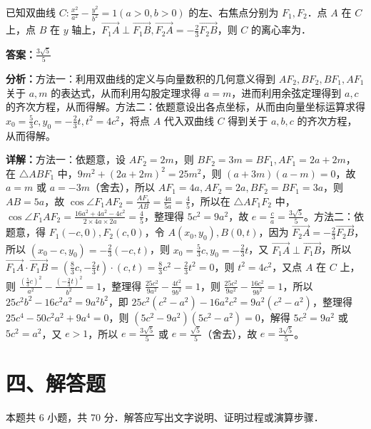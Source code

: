 \begin{question}[points=5]
已知双曲线 $C:\frac{x^2}{a^2}-\frac{y^2}{b^2}=1(a>0,b>0)$ 的左、右焦点分别为 $F_1, F_2$．点 $A$ 在 $C$ 上，点 $B$ 在 $y$ 轴上，$\overrightarrow{F_1A}\perp\overrightarrow{F_1B}, \overrightarrow{F_2A}=-\frac{2}{3}\overrightarrow{F_2B}$，则 $C$ 的离心率为．
\begin{solution}
\textbf{答案：}$\frac{3\sqrt{5}}{5}$

\textbf{分析：}方法一：利用双曲线的定义与向量数积的几何意义得到 $AF_2, BF_2, BF_1, AF_1$ 关于 $a, m$ 的表达式，从而利用勾股定理求得 $a=m$，进而利用余弦定理得到 $a,c$ 的齐次方程，从而得解。方法二：依题意设出各点坐标，从而由向量坐标运算求得 $x_0=\frac{5}{3}c, y_0=-\frac{2}{3}t, t^2=4c^2$，将点 $A$ 代入双曲线 $C$ 得到关于 $a,b,c$ 的齐次方程，从而得解。

\textbf{详解：}方法一：依题意，设 $AF_2=2m$，则 $BF_2=3m=BF_1, AF_1=2a+2m$，在 $\triangle ABF_1$ 中，$9m^2+(2a+2m)^2=25m^2$，则 $(a+3m)(a-m)=0$，故 $a=m$ 或 $a=-3m$（舍去），所以 $AF_1=4a, AF_2=2a, BF_2=BF_1=3a$，则 $AB=5a$，故 $\cos\angle F_1AF_2=\frac{AF_1}{AB}=\frac{4a}{5a}=\frac{4}{5}$，所以在 $\triangle AF_1F_2$ 中，$\cos\angle F_1AF_2=\frac{16a^2+4a^2-4c^2}{2\times4a\times2a}=\frac{4}{5}$，整理得 $5c^2=9a^2$，故 $e=\frac{c}{a}=\frac{3\sqrt{5}}{5}$。方法二：依题意，得 $F_1(-c,0), F_2(c,0)$，令 $A(x_0,y_0), B(0,t)$，因为 $\overrightarrow{F_2A}=-\frac{2}{3}\overrightarrow{F_2B}$，所以 $(x_0-c, y_0)=-\frac{2}{3}(-c,t)$，则 $x_0=\frac{5}{3}c, y_0=-\frac{2}{3}t$，又 $\overrightarrow{F_1A}\perp\overrightarrow{F_1B}$，所以 $\overrightarrow{F_1A}\cdot\overrightarrow{F_1B}=(\frac{8}{3}c, -\frac{2}{3}t)\cdot(c,t)=\frac{8}{3}c^2-\frac{2}{3}t^2=0$，则 $t^2=4c^2$，又点 $A$ 在 $C$ 上，则 $\frac{(\frac{5}{3}c)^2}{a^2}-\frac{(-\frac{2}{3}t)^2}{b^2}=1$，整理得 $\frac{25c^2}{9a^2}-\frac{4t^2}{9b^2}=1$，则 $\frac{25c^2}{9a^2}-\frac{16c^2}{9b^2}=1$，所以 $25c^2b^2-16c^2a^2=9a^2b^2$，即 $25c^2(c^2-a^2)-16a^2c^2=9a^2(c^2-a^2)$，整理得 $25c^4-50c^2a^2+9a^4=0$，则 $(5c^2-9a^2)(5c^2-a^2)=0$，解得 $5c^2=9a^2$ 或 $5c^2=a^2$，又 $e>1$，所以 $e=\frac{3\sqrt{5}}{5}$ 或 $e=\frac{\sqrt{5}}{5}$（舍去），故 $e=\frac{3\sqrt{5}}{5}$。
\end{solution}
\end{question}

\section*{四、解答题}
本题共 6 小题，共 70 分．解答应写出文字说明、证明过程或演算步骤．

